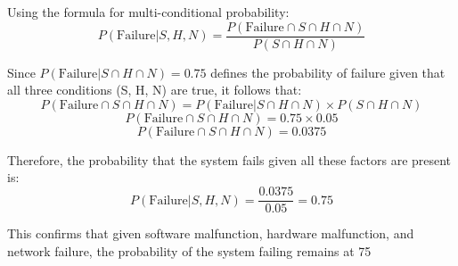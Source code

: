     Using the formula for multi-conditional probability:
\[ P(\text{Failure} | S, H, N) = \frac{P(\text{Failure} \cap S \cap H \cap N)}{P(S \cap H \cap N)} \]

Since \( P(\text{Failure} | S \cap H \cap N) = 0.75 \) defines the probability of failure given that all three conditions (S, H, N) are true, it follows that:
\[ P(\text{Failure} \cap S \cap H \cap N) = P(\text{Failure} | S \cap H \cap N) \times P(S \cap H \cap N) \]
\[ P(\text{Failure} \cap S \cap H \cap N) = 0.75 \times 0.05 \]
\[ P(\text{Failure} \cap S \cap H \cap N) = 0.0375 \]

Therefore, the probability that the system fails given all these factors are present is:
\[ P(\text{Failure} | S, H, N) = \frac{0.0375}{0.05} = 0.75 \]

This confirms that given software malfunction, hardware malfunction, and network failure, the probability of the system failing remains at 75%
